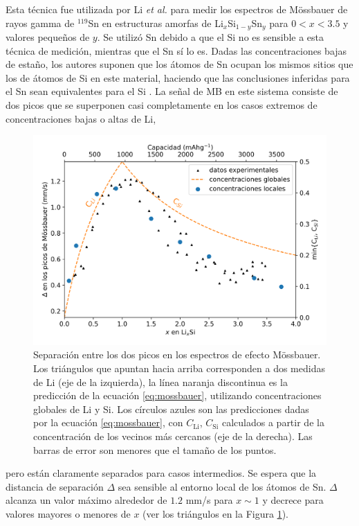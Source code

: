Esta técnica fue utilizada por Li \textit{et al.} \cite{li2009} para medir los espectros de 
Mössbauer de rayos gamma de $^{119}$Sn en estructuras amorfas de 
Li$_x$Si$_{1-y}$Sn$_y$ para $0 < x < 3.5$ y valores pequeños de $y$. Se utilizó Sn debido a que el Si no es sensible a esta técnica de medición, mientras que el Sn sí lo es.
Dadas las concentraciones bajas de estaño, los autores suponen que los átomos de Sn
ocupan los mismos sitios que los de átomos de Si en este material, haciendo que 
las conclusiones inferidas para el Sn sean equivalentes para el Si 
\cite{hatchard2005}. La señal de MB en este sistema consiste de dos picos que se superponen casi 
completamente en los casos extremos de concentraciones bajas o altas de Li, 
\begin{figure}[h!]
    \centering
    \includegraphics[width=.7\textwidth]{Silicio/prediccion/resultados/mossbauer/mossbauer.png}
    \caption{Separación entre los dos picos en los espectros de efecto 
    Mössbauer. Los triángulos que apuntan hacia arriba corresponden a dos 
    medidas de Li  \cite{li2009} (eje de la izquierda), la línea naranja discontinua es la 
    predicción de la ecuación \ref{eq:mossbauer}, utilizando concentraciones 
    globales de Li y Si. Los círculos azules son las predicciones dadas 
    por la ecuación \ref{eq:mossbauer}, con $C_{\text{Li}}$, $C_{\text{Si}}$ 
    calculados a partir de la concentración de los vecinos más cercanos (eje de 
    la derecha). Las barras de error son menores que el tamaño de los puntos.}
    \label{fig:mossbauer}
\end{figure}
pero están claramente separados para casos intermedios. Se espera que la distancia de separación
$\Delta$ sea sensible al entorno local de los átomos de Sn. $\Delta$
alcanza un valor máximo alrededor de $1.2$ mm/s para $x \sim 1$ y decrece para 
valores mayores o menores de $x$ (ver los triángulos en la Figura \ref{fig:mossbauer}).
